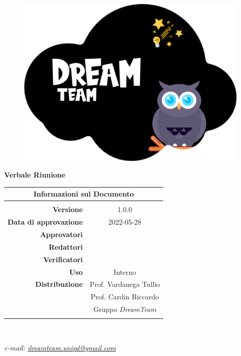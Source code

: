 \begin{center}

	\begin{figure}
		\centering
		\includegraphics[scale=0.05]{Sezioni/images/DreamTeam.png}
	\end{figure}

	{\Huge{\textbf{Verbale Riunione \D}}} \\ [1cm]

	\begin{table}[htbp]
		\centering
		\begin{tabular}{r|c}
			\multicolumn{2}{c}{\textbf{Informazioni sul Documento}}   \\
			\hline                                                    \\
			\textbf{Versione}             & 1.0.0                     \\ \rule{0pt}{3ex}
			\textbf{Data di approvazione} &        2022-05-28             \\ \rule{0pt}{3ex}
			\textbf{Approvatori}          &   \MG                        \\ \rule{0pt}{3ex}
			\textbf{Redattori}            & \GC                       \\ \rule{0pt}{3ex}
			\textbf{Verificatori}         &        \PV                 \\ \rule{0pt}{3ex}
			\textbf{Uso}                  & Interno                   \\ \rule{0pt}{3ex}
			\textbf{Distribuzione}        & Prof. Vardanega Tullio    \\ \rule{0pt}{2ex}
			                              & Prof. Cardin Riccardo     \\ \rule{0pt}{2ex}
			                              & Gruppo \textit{DreamTeam} \\ \rule{0pt}{0.1cm}
		\end{tabular} \\ [0.5cm]
	\end{table}

	\textsl{ e-mail: \href{mailto:dreamteam.unipd@gmail.com}{dreamteam.unipd@gmail.com} } \\[2cm]
\end{center}
\pagebreak